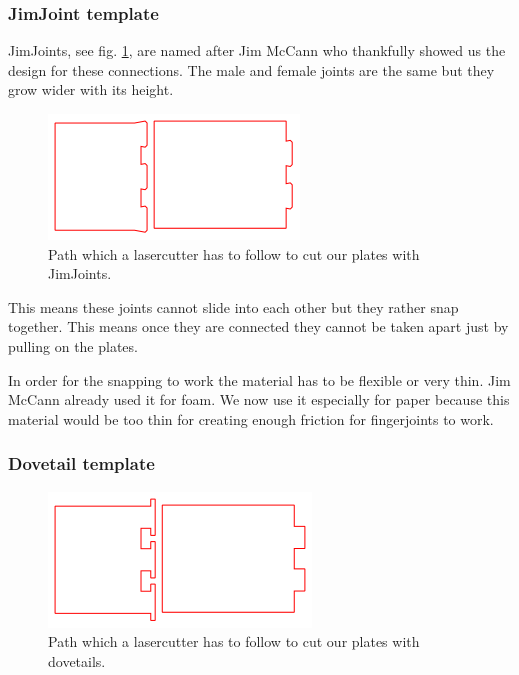 \documentclass[../ClassicThesis.tex]{subfiles}
\begin{document}
\subsubsection{JimJoint template}


JimJoints, see fig. \ref{fig:jimJoints}, are named after Jim McCann who thankfully showed us the design for these connections.
The male and female joints are the same but they grow wider with its height.

\begin{figure}[!ht]
\centering
\includegraphics[width=.5\columnwidth]{Images/jimjoints.png}
\caption{Path which a lasercutter has to follow to cut our plates with JimJoints.}
\label{fig:jimJoints}
\end{figure}

This means these joints cannot slide into each other but they rather snap together. This means once they are connected they cannot be taken apart just by pulling on the plates. 

In order for the snapping to work the material has to be flexible or very thin. Jim McCann already used it for foam. We now use it especially for paper because this material would be too thin for creating enough friction for fingerjoints to work.

\subsubsection{Dovetail template}

\begin{figure}[!ht]
\centering
\includegraphics[width=.5\columnwidth]{Images/schwalbe.png}
\caption{Path which a lasercutter has to follow to cut our plates with dovetails.}
\label{fig:dovetailJoints}
\end{figure}
    
\end{document}
